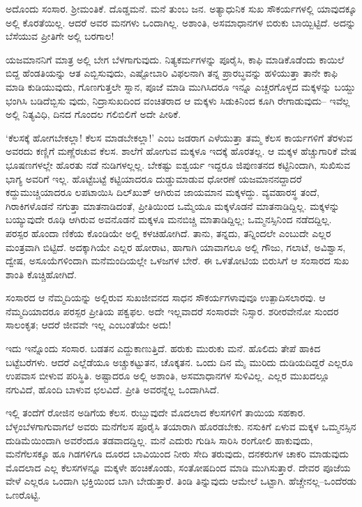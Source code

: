 ಅದೊಂದು ಸಂಸಾರ. ಶ‍್ರೀಮಂತಿಕೆ. ದೊಡ್ಡಮನೆ. ಮನೆ ತುಂಬ ಜನ. ಅತ್ಯಾಧುನಿಕ ಸುಖ ಸೌಕರ್ಯಗಳಲ್ಲಿ ಯಾವುದಕ್ಕೂ ಅಲ್ಲಿ ಕೊರತೆಯಿಲ್ಲ. ಆದರೆ ಅವರ ಮನಗಳು ಒಂದಾಗಿಲ್ಲ. ಅಶಾಂತಿ, ಅಸಮಾಧಾನಗಳ ಬಿರುಕು ಬಾಯ್ಬಿಟ್ಟಿದೆ. ಅದನ್ನು ಬೆಸೆಯುವ ಪ್ರೀತಿಗೇ ಅಲ್ಲಿ ಬರಗಾಲ!

ಯಜಮಾನನಿಗೆ ಮಾತ್ರ ಅಲ್ಲಿ ಬೇಗ ಬೆಳಗಾಗುವುದು. ನಿತ್ಯಕರ್ಮಗಳನ್ನು ಪೂರೈಸಿ, ಕಾಫಿ ಮಾಡಿಕೊಡೆಂದು ಕಾಯಿಲೆ ಬಿದ್ದ ಹೆಂಡತಿಯನ್ನು ಆತ ಎಬ್ಬಿಸುವುದು, ಎಷ್ಟೋಬಾರಿ ವಿಫಲನಾಗಿ ತನ್ನ ಪ್ರಾರಬ್ಧವನ್ನು ಹಳಿಯುತ್ತಾ ತಾನೇ ಕಾಫಿ ಮಾಡಿ ಕುಡಿಯುವುದು, ಗೊಣಗುತ್ತಲೇ ಸ್ನಾನ, ಪೂಜೆ ಮಾಡಿ ಮುಗಿಸಿದರೂ ಇನ್ನೂ ಎಚ್ಚರಗೊಳ್ಳದ ಮಕ್ಕಳನ್ನು ಬಯ್ದು ಭಂಗಿಸಿ ಬಡಿದೆಬ್ಬಿಸು ವುದು, ನಿದ್ರಾಸುಖದಿಂದ ವಂಚಿತರಾದ ಆ ಮಕ್ಕಳು ಸಿಡುಕಿನಿಂದ ಕೂಗಿ ರೇಗಾಡುವುದು– ಇವೆಲ್ಲ ಅಲ್ಲಿ ನಿತ್ಯವಿಧಿ, ದಿನದ ಗೊಂದಲ ಗಲಿಬಿಲಿಗೆ ಅದೇ ಪೀಠಿಕೆ.

‘ಕೆಲಸಕ್ಕೆ ಹೋಗಬೇಕಲ್ಲಾ! ಕೆಲಸ ಮಾಡಬೇಕಲ್ಲಾ!’ ಎಂಬ ಜಡರಾಗ ಎಳೆಯುತ್ತಾ ತಮ್ಮ ಕೆಲಸ ಕಾರ್ಯಗಳಿಗೆ ತೆರಳುವ ಅವರದು ಕಣ್ಣಿಗೆ ಮಣ್ಣೆರಚುವ ಕೆಲಸ. ಶಾಲೆಗೆ ಹೋಗುವ ಮಕ್ಕಳೂ ಇದಕ್ಕೆ ಹೊರತಲ್ಲ. ಆ ಮಕ್ಕಳ ಹೆಚ್ಚುಗಾರಿಕೆ ವೇಷ ಭೂಷಣಗಳಲ್ಲೇ ಹೊರತು ನಡೆ ನುಡಿಗಳಲ್ಲಲ್ಲ. ಬೇಕಷ್ಟು ಐಶ್ವರ್ಯ ಇದ್ದರೂ ಜಿಪುಣತನದ ಕಟ್ಟಿನಿಂದಾಗಿ, ಸುಖಿಸುವ ಭಾಗ್ಯ ಅವರಿಗೆ ಇಲ್ಲ. ಹೊಟ್ಟೆಬಟ್ಟೆ ಕಟ್ಟಿಯಾದರೂ ದುಡ್ಡುಮಾಡುವ ಧೋರಣೆ ಯಜಮಾನನದ್ದಾದರೆ ಕದ್ದುಮುಚ್ಚಿಯಾದರೂ ಲಪಟಾಯಿಸಿ ದಿಲ್​ಖುಶ್ ಆಗಿರುವ ಜಾಯಮಾನ ಮಕ್ಕಳದ್ದು. ವ್ಯವಹಾರಸ್ಥ ತಂದೆ, ಗಿರಾಕಿಗಳೊಡನೆ ನಗುತ್ತಾ ಮಾತನಾಡಿದಂತೆ, ಪ್ರೀತಿಯಿಂದ ಒಮ್ಮೆಯೂ ಮಕ್ಕಳೊಡನೆ ಮಾತನಾಡಿದ್ದಿಲ್ಲ. ಮಕ್ಕಳನ್ನು ಬಯ್ಯುವುದೇ ರೂಢಿ ಆಗಿರುವ ಅವನೊಡನೆ ಮಕ್ಕಳೂ ಮನಬಿಚ್ಚಿ ಮಾತಾಡಿದ್ದಿಲ್ಲ; ಒಮ್ಮನಸ್ಸಿನಿಂದ ನಡೆದದ್ದಿಲ್ಲ. ಪರಸ್ಪರ ಹೊಂದಾ ಣಿಕೆಯ ಕೊಂಡಿಯೇ ಅಲ್ಲಿ ಕಳಚಿಹೋಗಿದೆ. ತಾನು, ತನ್ನದು, ತನ್ನಿಂದಲೇ ಎಂಬುದೇ ಎಲ್ಲರ ಮಂತ್ರವಾಗಿ ಬಿಟ್ಟಿದೆ. ಅದಕ್ಕಾಗಿಯೇ ಎಲ್ಲರ ಹೋರಾಟ, ಹಾಗಾಗಿ ಯಾವಾಗಲೂ ಅಲ್ಲಿ ಗೌಜು, ಗಲಾಟೆ, ಅವಿಶ್ವಾಸ, ದ್ವೇಷ, ಅಸೂಯೆಗಳಿಂದಾಗಿ ಮನೆಮಂದಿಯಲ್ಲೇ ಒಳಜಗಳ ಬೇರೆ. ಈ ಒಳತೋಟಿಯ ಬಿರುಸಿಗೆ ಆ ಸಂಸಾರದ ಸುಖ ಶಾಂತಿ ಕೊಚ್ಚಿಹೋಗಿದೆ.

ಸಂಸಾರದ ಆ ನೆಮ್ಮದಿಯನ್ನು ಅಲ್ಲಿರುವ ಸುಖಜೀವನದ ಸಾಧನ ಸೌಕರ್ಯಗಳಾವುವೂ ಉತ್ಪಾದಿಸಲಾರವು. ಆ ನೆಮ್ಮದಿಯಾದರೂ ಪರಸ್ಪರ ಪ್ರೀತಿಯ ಪಕ್ವಫಲ. ಅದೇ ಇಲ್ಲವಾದರೆ ಸಂಸಾರವೇ ನಿಸ್ಸಾರ. ಶರೀರವೇನೋ ಸುಂದರ ಸಾಲಂಕೃತ; ಆದರೆ ಜೀವವೇ ಇಲ್ಲ ಎಂಬಂತೆಯೇ ಅದು!

ಇದು ಇನ್ನೊಂದು ಸಂಸಾರ. ಬಡತನ ಎದ್ದುಕಾಣುತ್ತಿದೆ. ಹರುಕು ಮುರುಕು ಮನೆ. ಹೊಲಿದು ತೇಪೆ ಹಾಕಿದ ಬಟ್ಟೆಬರೆಗಳು. ಆದರೆ ಎಲ್ಲೆಡೆಯೂ ಅಚ್ಚುಕಟ್ಟುತನ, ಚೊಕ್ಕತನ. ಒಂದು ದಿನ ಮೈ ಮುರಿದು ದುಡಿಯದಿದ್ದರೆ ಎಲ್ಲರೂ ಉಪವಾಸ ಬೀಳುವ ಪರಿಸ್ಥಿತಿ. ಅಷ್ಟಾದರೂ ಅಲ್ಲಿ ಅಶಾಂತಿ, ಅಸಮಾಧಾನಗಳ ಸುಳಿವಿಲ್ಲ. ಎಲ್ಲರ ಮುಖದಲ್ಲೂ ನಗುವಿದೆ, ಹೊಂದಿ ಬಾಳುವ ಛಲವಿದೆ. ಪ್ರೀತಿ ಅವರನ್ನೆಲ್ಲ ಒಂದಾಗಿಸಿದೆ.

ಇಲ್ಲಿ ತಂದೆಗೆ ರೋಜಿನ ಅಡಿಗೆಯ ಕೆಲಸ. ರುಬ್ಬುವುದೇ ಮೊದಲಾದ ಕೆಲಸಗಳಿಗೆ ತಾಯಿಯ ಸಹಕಾರ. ಬೆಳ್ಳಂಬೆಳಗಾಗುವಾಗಲೆ ಅವರು ಮನೆಗೆಲಸ ಪೂರೈಸಿ ತಯಾರಾಗಿ ಹೊರಡಬೇಕು. ನಸುಕಿಗೆ ಏಳುವ ಮಕ್ಕಳ ಒಮ್ಮನಸ್ಸಿನ ದುಡಿಮೆಯಿಂದಾಗಿ ಅವರೆಂದೂ ತಡವಾದದ್ದಿಲ್ಲ. ಮನೆ ಎದುರು ಗುಡಿಸಿ ಸಾರಿಸಿ ರಂಗೋಲಿ ಹಾಕುವುದು, ಮನೆಗೆಲಸಕ್ಕೂ ಹೂ ಗಿಡಗಳಿಗೂ ದೂರದ ಬಾವಿಯಿಂದ ನೀರು ಸೇದಿ ತರುವುದು, ದನಕರುಗಳ ಚಾಕರಿ ಮಾಡುವುದು ಮೊದಲಾದ ಎಲ್ಲ ಕೆಲಸಗಳನ್ನೂ ಮಕ್ಕಳೇ ಹಂಚಿಕೊಂಡು, ಸಂತೋಷದಿಂದ ಮಾಡಿ ಮುಗಿಸುತ್ತಾರೆ. ದೇವರ ಪೂಜೆಯ ವೇಳೆ ಎಲ್ಲರೂ ಒಂದಾಗಿ ಭಕ್ತಿಯಿಂದ ಬಾಗಿ ಬೇಡುತ್ತಾರೆ. ತಿಂಡಿ ತಿನ್ನುವುದು ಆಮೇಲೆ ಒಟ್ಟಾಗಿ. ಹೆಚ್ಚೇನಲ್ಲ–ಒಂದೆರಡು ಒಣರೊಟ್ಟಿ.

